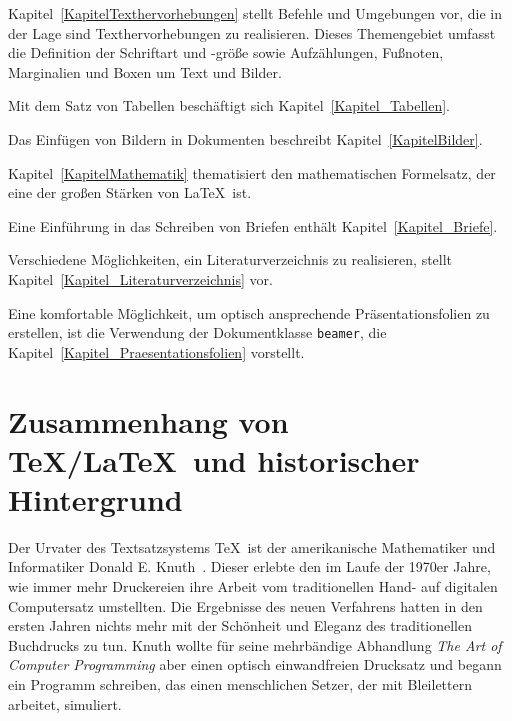 \documentclass[a4paper,10pt,twoside]{scrbook}
\begin{document}
Kapitel~\ref{KapitelTexthervorhebungen} stellt Befehle und Umgebungen vor, die in der Lage sind Texthervorhebungen zu realisieren. Dieses Themengebiet umfasst die Definition der Schriftart und -größe sowie Aufzählungen, Fußnoten, Marginalien und Boxen um Text und Bilder. 

Mit dem Satz von Tabellen beschäftigt sich Kapitel~\ref{Kapitel_Tabellen}.

Das Einfügen von Bildern in Dokumenten beschreibt Kapitel~\ref{KapitelBilder}.

Kapitel~\ref{KapitelMathematik} thematisiert den mathematischen Formelsatz, der eine der großen Stärken von \LaTeX\ ist.

Eine Einführung in das Schreiben von Briefen enthält Kapitel~\ref{Kapitel_Briefe}.

Verschiedene Möglichkeiten, ein Literaturverzeichnis zu realisieren, stellt Kapitel~\ref{Kapitel_Literaturverzeichnis} vor.

Eine komfortable Möglichkeit, um optisch ansprechende Präsentationsfolien zu erstellen, ist die Verwendung der Dokumentklasse \verb!beamer!, die Kapitel~\ref{Kapitel_Praesentationsfolien} vorstellt.


\section{Zusammenhang von \TeX/\LaTeX\ und historischer Hintergrund}






Der Urvater des Textsatzsystems \TeX\ ist der amerikanische Mathematiker und Informatiker 
Donald E. Knuth~\cite{DonaldKnuthWebpage}. Dieser erlebte den im Laufe der 1970er Jahre, wie immer mehr Druckereien ihre Arbeit vom traditionellen Hand- auf digitalen Computersatz umstellten. Die Ergebnisse des neuen Verfahrens hatten in den ersten Jahren nichts mehr mit der Schönheit und Eleganz des traditionellen Buchdrucks zu tun. Knuth wollte für seine mehrbändige Abhandlung \textsl{The Art of Computer Programming} aber einen optisch einwandfreien Drucksatz und begann ein Programm schreiben, das einen menschlichen Setzer, der mit Bleilettern arbeitet, simuliert. 
\end{document}
